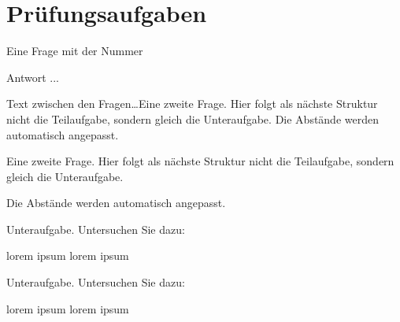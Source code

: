 \documentclass[a4paper,12pt]{article}
\begin{document}
\section{Prüfungsaufgaben}


\question%
	Eine Frage mit der Nummer %
{}
%
\begin{solution}
	Antwort ...
\end{solution}


Text zwischen den Fragen\ldots Eine zweite Frage. Hier folgt als nächste Struktur nicht die Teilaufgabe, sondern gleich die Unteraufgabe. Die Abstände werden automatisch angepasst.


\question%
Eine zweite Frage. Hier folgt als nächste Struktur nicht die Teilaufgabe, sondern gleich die Unteraufgabe. 

Die Abstände werden automatisch angepasst.
\begin{subparts}
		\subpart Unteraufgabe. Untersuchen Sie  dazu:
	\begin{subsubparts}
		\subsubpart lorem ipsum
		\subsubpart lorem ipsum
	\end{subsubparts}
		\subpart Unteraufgabe. Untersuchen Sie  dazu:
	\begin{subsubparts}
		\subsubpart lorem ipsum
		\subsubpart lorem ipsum
	\end{subsubparts}
\end{subparts}
\omitsolution
\end{document}
